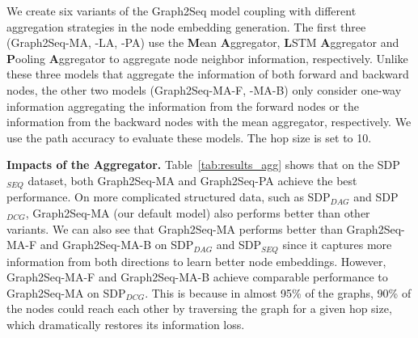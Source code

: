 \documentclass{article} \usepackage{iclr2019_conference,times}
\begin{document}
We create six variants of the Graph2Seq model coupling with different aggregation strategies in the node embedding generation. The first three (Graph2Seq-MA, -LA, -PA) use the \textbf{M}ean \textbf{A}ggregator, \textbf{L}STM \textbf{A}ggregator and \textbf{P}ooling \textbf{A}ggregator
to aggregate node neighbor information, respectively.
Unlike these three models that aggregate the information of both forward and backward nodes,
the other two models (Graph2Seq-MA-F, -MA-B) only consider one-way information aggregating the information from the forward nodes or the information from the backward nodes with the mean aggregator, respectively. We use the path accuracy to evaluate these models. The hop size is set to 10. 

\textbf{Impacts of the Aggregator.} Table~\ref{tab:results_agg} shows that on the SDP$_{SEQ}$ dataset, both Graph2Seq-MA and Graph2Seq-PA achieve the best performance.
On more complicated structured data, such as SDP$_{DAG}$ and SDP$_{DCG}$, Graph2Seq-MA (our default model) also performs better than other variants.
We can also see that Graph2Seq-MA performs better than Graph2Seq-MA-F and Graph2Seq-MA-B on SDP$_{DAG}$ and SDP$_{SEQ}$ since it captures more information from both directions to learn better node embeddings. However, Graph2Seq-MA-F and Graph2Seq-MA-B achieve comparable performance to Graph2Seq-MA on SDP$_{DCG}$. This is because in almost 95\% of the graphs, 90\% of the nodes could reach each other by traversing the graph for a given hop size, which dramatically restores its information loss.
\end{document}
